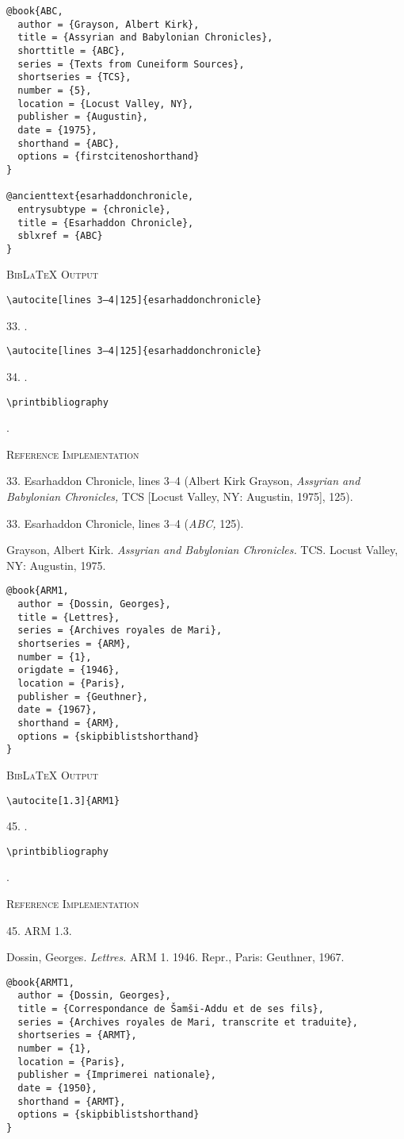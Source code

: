 \documentclass[a4paper]{article}
\newcommand\citetestbib[6]{%
  {\textsc{BibLaTeX Output}\par
   \nobreak
   \texttt{\textbackslash autocite[#2]\{#5\}}\par
   \color{biblatex-colour}
   #1. \cite[#2]{#5}.\par
   \color{black}
   \texttt{\textbackslash autocite[#4]\{#5\}}\par
   \color{biblatex-colour}
   #3. \cite[#4]{#5}.\par
   \color{black}
   \texttt{\textbackslash printbibliography}\par
   \color{biblatex-colour}
   \hangindent\bibindent\bibentrycite{#6}.\par}}
\newcommand\citetestns[3]{%
  {\textsc{BibLaTeX Output}\par
   \nobreak
   \texttt{\textbackslash autocite[#2]\{#3\}}\par
   \color{biblatex-colour}
   #1. \cite[#2]{#3}.\par
   \color{black}
   \texttt{\textbackslash printbibliography}\par
   \color{biblatex-colour}
   \sloppy\hangindent\bibindent\bibentrycite{#3}.\par}}
\newenvironment{refimp}{%
  \begin{minipage}{\linewidth}
    \setlength{\parskip}{1ex}
    \textsc{Reference Implementation}\par
    \nobreak
    \color{reference-colour}
}{\end{minipage}}
\begin{document}
\begin{lstlisting}
@book{ABC,
  author = {Grayson, Albert Kirk},
  title = {Assyrian and Babylonian Chronicles},
  shorttitle = {ABC},
  series = {Texts from Cuneiform Sources},
  shortseries = {TCS},
  number = {5},
  location = {Locust Valley, NY},
  publisher = {Augustin},
  date = {1975},
  shorthand = {ABC},
  options = {firstcitenoshorthand}
}

@ancienttext{esarhaddonchronicle,
  entrysubtype = {chronicle},
  title = {Esarhaddon Chronicle},
  sblxref = {ABC}
}
\end{lstlisting}

\citetestbib{33}{lines 3–4|125}{34}{lines 3–4|125}{esarhaddonchronicle}{ABC}

\begin{refimp}
  33. Esarhaddon Chronicle, lines 3–4 (Albert Kirk Grayson, \emph{Assyrian and
  Babylonian Chronicles,} TCS [Locust Valley, NY: Augustin, 1975], 125).

  33. Esarhaddon Chronicle, lines 3–4 (\emph{ABC,} 125).

  \hangindent\bibindent Grayson, Albert Kirk. \emph{Assyrian and Babylonian
  Chronicles.} TCS. Locust Valley, NY: Augustin, 1975.
\end{refimp}

\begin{lstlisting}
@book{ARM1,
  author = {Dossin, Georges},
  title = {Lettres},
  series = {Archives royales de Mari},
  shortseries = {ARM},
  number = {1},
  origdate = {1946},
  location = {Paris},
  publisher = {Geuthner},
  date = {1967},
  shorthand = {ARM},
  options = {skipbiblistshorthand}
}
\end{lstlisting}

\citetestns{45}{1.3}{ARM1}

\begin{refimp}
  45. ARM 1.3.

  \hangindent\bibindent Dossin, Georges. \emph{Lettres.} ARM 1. 1946. Repr.,
  Paris: Geuthner, 1967.
\end{refimp}

\begin{lstlisting}
@book{ARMT1,
  author = {Dossin, Georges},
  title = {Correspondance de Šamši-Addu et de ses fils},
  series = {Archives royales de Mari, transcrite et traduite},
  shortseries = {ARMT},
  number = {1},
  location = {Paris},
  publisher = {Imprimerei nationale},
  date = {1950},
  shorthand = {ARMT},
  options = {skipbiblistshorthand}
}
\end{lstlisting}
\end{document}
